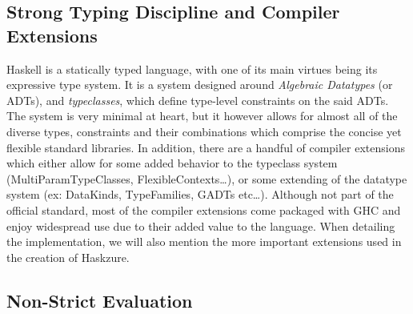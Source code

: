 \documentclass[11pt]{report}
\begin{document}
\subsection{Strong Typing Discipline and Compiler Extensions}

Haskell is a statically typed language, with one of its main virtues being
its expressive type system. It is a system designed around
\textit{Algebraic Datatypes} (or ADTs), and \textit{typeclasses}, which
define type-level constraints on the said ADTs. The system is very minimal
at heart, but it however allows for almost all of the diverse types,
constraints and their combinations which comprise the concise yet flexible
standard libraries. \newline
In addition, there are a handful of compiler extensions which either allow for
some added behavior to the typeclass system (MultiParamTypeClasses,
FlexibleContexts\ldots), or some extending of the datatype system (ex:
DataKinds, TypeFamilies, GADTs etc\ldots). Although not part of the official standard,
most of the compiler extensions come packaged with GHC and enjoy widespread
use due to their added value to the language. When detailing the
implementation, we will also mention the more important extensions used in the
creation of Haskzure.

\subsection{Non-Strict Evaluation}
\end{document}
